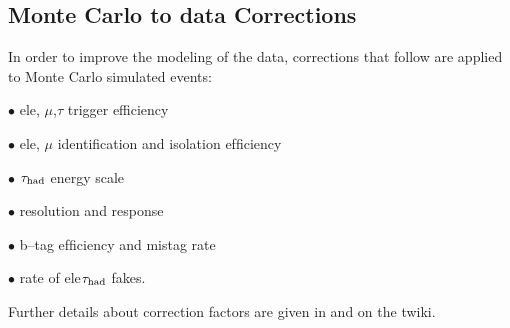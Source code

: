 \subsection{Monte Carlo to data Corrections}
\label{sec:scaleFactors}
In order to improve the modeling of the data, corrections that follow are
 applied  to Monte Carlo simulated events:

$\bullet$ ele, $\mu$,$\tau$ trigger efficiency

$\bullet$ ele, $\mu$ identiﬁcation and isolation efﬁciency

$\bullet$ $\tau_{\rm had}$ energy scale

$\bullet$ \MET resolution and response

$\bullet$ b–tag efﬁciency and mistag rate

$\bullet$ rate of ele\rightarrow $\tau_{\rm had}$  fakes.

Further details about correction factors  are given in \cite{} and on the twiki\cite{}.
